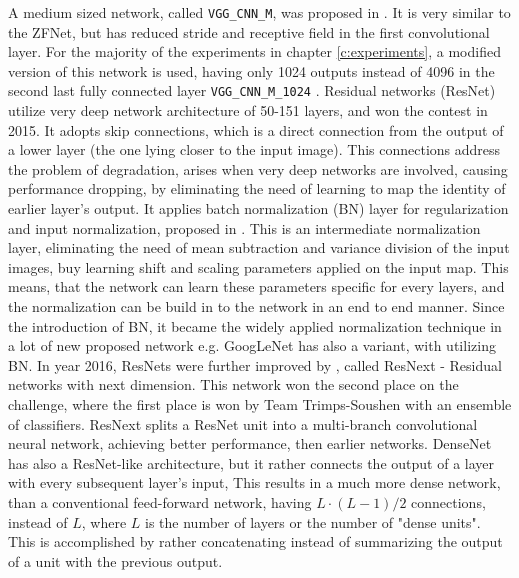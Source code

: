 \bigbreak
A medium sized network, called \texttt{VGG\_CNN\_M}, was proposed in \cite{Chatfield14}. It is very similar to the ZFNet, but has reduced stride and receptive field in the first convolutional layer. For the majority of the experiments in chapter \ref{c:experiments}, a modified version of this network is used, having only 1024 outputs instead of 4096 in the second last fully connected layer \texttt{VGG\_CNN\_M\_1024} \cite{Chatfield14}.
\bigbreak
Residual networks (ResNet) \cite{DBLP:journals/corr/HeZRS15} utilize very deep network architecture of 50-151 layers, and won the contest in 2015. It adopts skip connections, which is a direct connection from the output of a lower layer (the one lying closer to the input image). This connections address the problem of degradation, arises when very deep networks are involved, causing performance dropping, by eliminating the need of learning to map the identity of earlier layer's output. It applies batch normalization (BN) layer for regularization and input normalization, proposed in \cite{DBLP:journals/corr/IoffeS15}. This is an intermediate normalization layer, eliminating the need of mean subtraction and variance division of the input images, buy learning shift and scaling parameters applied on the input map. This means, that the network can learn these parameters specific for every layers, and the normalization can be build in to the network in an end to end manner. Since the introduction of BN, it became the widely applied normalization technique in a lot of new proposed network e.g. GoogLeNet has also a variant, with utilizing BN.
\bigbreak
In year 2016, ResNets were further improved by \cite{DBLP:journals/corr/XieGDTH16}, called ResNext - Residual networks with next dimension. This network won the second place on the challenge, where the first place is won by Team Trimps-Soushen with an ensemble of classifiers. ResNext splits a ResNet unit into a multi-branch convolutional neural network, achieving better performance, then earlier networks.
\bigbreak
DenseNet \cite{DBLP:journals/corr/HuangLW16a} has also a ResNet-like architecture, but it rather connects the output of a layer with every subsequent layer's input, This results in a much more dense network, than a conventional feed-forward network, having $L\cdot(L-1)/2$ connections, instead of $L$, where $L$ is the number of layers or the number of "dense units". This is accomplished by rather concatenating instead of summarizing the output of a unit with the previous output.
\bigbreak

